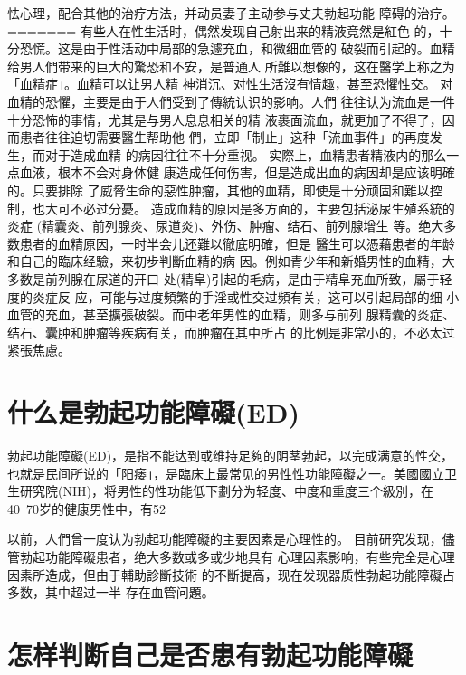 \documentclass[12pt,UTF8]{ctexbook}
\begin{document}
怯心理，配合其他的治疗方法，并动员妻子主动参与丈夫勃起功能
障碍的治疗。
=======
有些人在性生活时，偶然发现自己射出来的精液竟然是紅色
的，十分恐慌。这是由于性活动中局部的急遽充血，和微细血管的
破裂而引起的。血精给男人們带来的巨大的驚恐和不安，是普通人
所難以想像的，这在醫学上称之为「血精症」。血精可以让男人精
神消沉、对性生活沒有情趣，甚至恐懼性交。
对血精的恐懼，主要是由于人們受到了傳統认识的影响。人們
往往认为流血是一件十分恐怖的事情，尤其是与男人息息相关的精
液裹面流血，就更加了不得了，因而患者往往迫切需要醫生帮助他
們，立即「制止」这种「流血事件」的再度发生，而对于造成血精
的病因往往不十分重视。
实際上，血精患者精液内的那么一点血液，根本不会对身体健
康造成任何伤害，但是造成出血的病因却是应该明確的。只要排除
了威脅生命的惡性肿瘤，其他的血精，即使是十分顽固和難以控
制，也大可不必过分憂。
造成血精的原因是多方面的，主要包括泌尿生殖系統的炎症
(精囊炎、前列腺炎、尿道炎)、外伤、肿瘤、结石、前列腺增生
等。绝大多数患者的血精原因，一时半会儿还難以徹底明確，但是
醫生可以憑藉患者的年龄和自己的臨床经驗，来初步判斷血精的病
因。例如青少年和新婚男性的血精，大多数是前列腺在尿道的开口
处(精阜)引起的毛病，是由于精阜充血所致，屬于轻度的炎症反
应，可能与过度頻繁的手淫或性交过頻有关，这可以引起局部的细
小血管的充血，甚至擴張破裂。而中老年男性的血精，则多与前列
腺精囊的炎症、结石、囊肿和肿瘤等疾病有关，而肿瘤在其中所占
的比例是非常小的，不必太过紧張焦慮。

\section{什么是勃起功能障礙(ED)}

勃起功能障礙(ED)，是指不能达到或维持足夠的阴茎勃起，以完成满意的性交，也就是民间所说的「阳痿」，是臨床上最常见的男性性功能障礙之一。美國國立卫生研究院(NIH)，将男性的性功能低下劃分为轻度、中度和重度三个級別，在40~70岁的健康男性中，有52%

以前，人們曾一度认为勃起功能障礙的主要因素是心理性的。
目前研究发现，儘管勃起功能障礙患者，绝大多数或多或少地具有
心理因素影响，有些完全是心理因素所造成，但由于輔助診斷技術
的不斷提高，现在发现器质性勃起功能障礙占多数，其中超过一半
存在血管问題。

\section{怎样判断自己是否患有勃起功能障礙}
\end{document}
